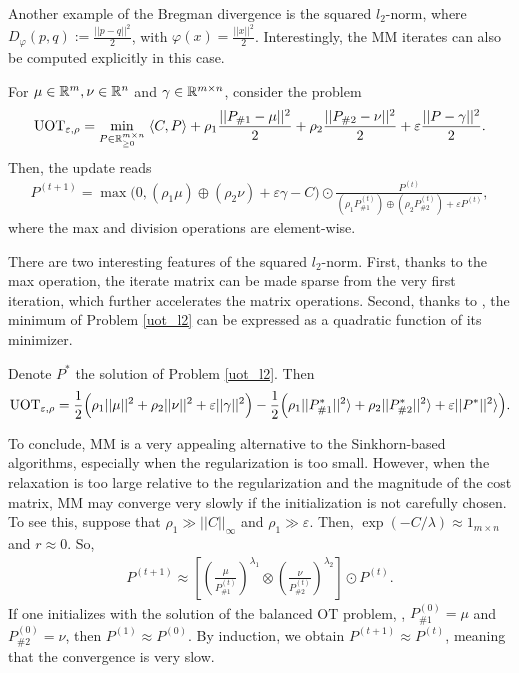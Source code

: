 Another example of the Bregman divergence is the squared $l_2$-norm, where
$D_{\varphi}(p, q) := \frac{|| p - q||^2}{2}$, with $\varphi(x) = \frac{||x||^2}{2}$. Interestingly,
the MM iterates can also be computed explicitly in this case.
\begin{corollary}
  \label{coro:uot_l2_mm}
  For $\mu \in \mathbb R^m, \nu \in \mathbb R^n$ and $\gamma \in \mathbb R^{m \times n}$,  consider the
  problem
  \begin{align}
  \label{uot_l2}
      \text{UOT}_{\varepsilon, \rho} =
      \min_{P \in \mathbb R^{m \times n}_{\geq 0}}
      \; \langle C, P \rangle + \rho_1 \frac{||P_{\# 1} - \mu||^2}{2}
      + \rho_2 \frac{|| P_{\# 2} - \nu ||^2}{2} + \varepsilon  \frac{||P - \gamma||^2}{2}.
  \end{align}
  Then, the update reads
  \begin{align}
      P^{(t+1)} = \max \Big(0, (\rho_1 \mu) \oplus (\rho_2 \nu) + \varepsilon \gamma - C \Big)
      \odot \frac{P^{(t)}}{(\rho_1 P^{(t)}_{\# 1}) \oplus (\rho_2 P^{(t)}_{\# 2})
      + \varepsilon P^{(t)}},
  \end{align}
  where the max and division operations are element-wise.
\end{corollary}
There are two interesting features of the squared $l_2$-norm. First, thanks to the max operation,
the iterate matrix can be made sparse from the very first iteration,
which further accelerates the matrix operations. Second, thanks to ,
the minimum of Problem \eqref{uot_l2} can be expressed as a quadratic function of its minimizer.
\begin{corollary}
  \label{coro:uot_l2_minimizer}
Denote $P^*$ the solution of Problem \eqref{uot_l2}. Then
\begin{align}
  \text{UOT}_{\varepsilon, \rho} = \frac{1}{2} \Big( \rho_1 ||\mu||^2
  + \rho_2 ||\nu||^2 + \varepsilon ||\gamma||^2 \Big)
  - \frac{1}{2} \Big( \rho_1 ||P^*_{\# 1}||^2 \rangle
  + \rho_2 || P^*_{\# 2} ||^2 \rangle + \varepsilon ||P^*||^2 \rangle \Big).
\end{align}
\end{corollary}
To conclude, MM is a very appealing alternative to the Sinkhorn-based algorithms,
especially when the regularization is too small. However,
when the relaxation is too large relative to the regularization and
the magnitude of the cost matrix, MM may converge very slowly if the initialization is
not carefully chosen. To see this, suppose that $\rho_1 \gg ||C||_{\infty}$ and
$\rho_1 \gg \varepsilon$. Then, $\exp(-C / \lambda) \approx 1_{m \times n}$ and $r \approx 0$. So,
\begin{align}
  P^{(t+1)} \approx \left[ \left( \frac{\mu}{P^{(t)}_{\# 1}}\right)^{\lambda_1} \otimes
  \left( \frac{\nu}{P^{(t)}_{\# 2}}\right)^{\lambda_2} \right] \odot P^{(t)}.
\end{align}
If one initializes with the solution of the balanced OT problem, \ie,
$P^{(0)}_{\# 1} = \mu$ and $P^{(0)}_{\# 2} = \nu$, then $P^{(1)} \approx P^{(0)}$.
By induction, we obtain $P^{(t+1)} \approx P^{(t)}$, meaning that the convergence is very slow.

